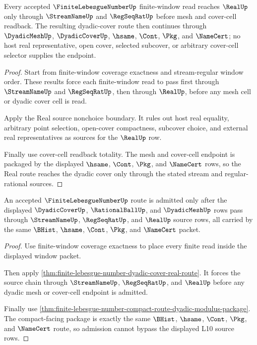 \begin{theorem}
\label{thm:finite-lebesgue-number-dyadic-cover-real-route}
Every accepted $\FiniteLebesgueNumberUp$ finite-window read reaches $\RealUp$ only through $\StreamNameUp$ and $\RegSeqRatUp$ before mesh and cover-cell readback. The resulting dyadic-cover route then continues through $\DyadicMeshUp$, $\DyadicCoverUp$, $\hsame$, $\Cont$, $\Pkg$, and $\NameCert$; no host real representative, open cover, selected subcover, or arbitrary cover-cell selector supplies the endpoint.
\end{theorem}
\begin{proof}
Start from finite-window coverage exactness and stream-regular window order. These results force each finite-window read to pass first through $\StreamNameUp$ and $\RegSeqRatUp$, then through $\RealUp$, before any mesh cell or dyadic cover cell is read.

Apply the Real source nonchoice boundary. It rules out host real equality, arbitrary point selection, open-cover compactness, subcover choice, and external real representatives as sources for the $\RealUp$ row.

Finally use cover-cell readback totality. The mesh and cover-cell endpoint is packaged by the displayed $\hsame$, $\Cont$, $\Pkg$, and $\NameCert$ rows, so the Real route reaches the dyadic cover only through the stated stream and regular-rational sources.
\end{proof}

\begin{theorem}
\label{thm:finite-lebesgue-number-source-chain-admission}
An accepted $\FiniteLebesgueNumberUp$ route is admitted only after the displayed $\DyadicCoverUp$, $\RationalBallUp$, and $\DyadicMeshUp$ rows pass through $\StreamNameUp$, $\RegSeqRatUp$, and $\RealUp$ source rows, all carried by the same $\BHist$, $\hsame$, $\Cont$, $\Pkg$, and $\NameCert$ packet.
\end{theorem}
\begin{proof}
Use finite-window coverage exactness to place every finite read inside the displayed window packet.

Then apply \autoref{thm:finite-lebesgue-number-dyadic-cover-real-route}. It forces the source chain through $\StreamNameUp$, $\RegSeqRatUp$, and $\RealUp$ before any dyadic mesh or cover-cell endpoint is admitted.

Finally use \autoref{thm:finite-lebesgue-number-compact-route-dyadic-modulus-package}. The compact-facing package is exactly the same $\BHist$, $\hsame$, $\Cont$, $\Pkg$, and $\NameCert$ route, so admission cannot bypass the displayed L10 source rows.
\end{proof}

